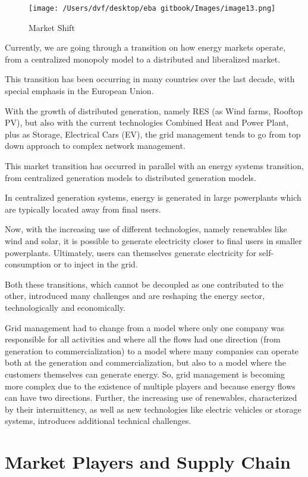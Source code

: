 \documentclass[]{book}
\theoremstyle{definition}
\theoremstyle{definition}
\theoremstyle{definition}
\theoremstyle{remark}
\begin{document}
\begin{figure}[htbp]
\centering
\texttt{[image: /Users/dvf/desktop/eba gitbook/Images/image13.png]}
\caption{Market Shift}
\end{figure}

Currently, we are going through a transition on how energy markets
operate, from a centralized monopoly model to a distributed and
liberalized market.

This transition has been occurring in many countries over the last
decade, with special emphasis in the European Union.

With the growth of distributed generation, namely RES (as Wind farms,
Rooftop PV), but also with the current technologies Combined Heat and
Power Plant, plus as Storage, Electrical Cars (EV), the grid management
tends to go from top down approach to complex network management.

This market transition has occurred in parallel with an energy systems
transition, from centralized generation models to distributed generation
models.

In centralized generation systems, energy is generated in large
powerplants which are typically located away from final users.

Now, with the increasing use of different technologies, namely
renewables like wind and solar, it is possible to generate electricity
closer to final users in smaller powerplants. Ultimately, users can
themselves generate electricity for self-consumption or to inject in the
grid.

Both these transitions, which cannot be decoupled as one contributed to
the other, introduced many challenges and are reshaping the energy
sector, technologically and economically.

Grid management had to change from a model where only one company was
responsible for all activities and where all the flows had one direction
(from generation to commercialization) to a model where many companies
can operate both at the generation and commercialization, but also to a
model where the customers themselves can generate energy. So, grid
management is becoming more complex due to the existence of multiple
players and because energy flows can have two directions. Further, the
increasing use of renewables, characterized by their intermittency, as
well as new technologies like electric vehicles or storage systems,
introduces additional technical challenges.

\section{Market Players and Supply
Chain}\label{market-players-and-supply-chain}
\end{document}

